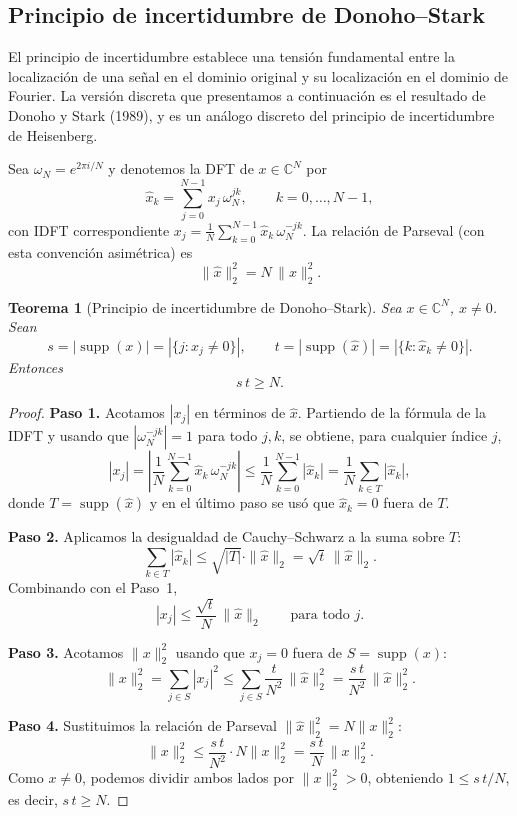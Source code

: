 \documentclass[12pt]{article}
\newtheorem{theorem}{Teorema}
\newcommand{\C}{\mathbb{C}}
\begin{document}
\subsection*{Principio de incertidumbre de Donoho--Stark}

El principio de incertidumbre establece una tensión fundamental entre la localización de una señal en el dominio original y su localización en el dominio de Fourier. La versión discreta que presentamos a continuación es el resultado de Donoho y Stark (1989), y es un análogo discreto del principio de incertidumbre de Heisenberg.

Sea $\omega_N = e^{2\pi i/N}$ y denotemos la DFT de $x \in \C^N$ por
\[
  \hat{x}_k = \sum_{j=0}^{N-1} x_j\, \omega_N^{jk}, \qquad k = 0, \ldots, N-1,
\]
con IDFT correspondiente $x_j = \frac{1}{N}\sum_{k=0}^{N-1} \hat{x}_k\, \omega_N^{-jk}$.
La relación de Parseval (con esta convención asimétrica) es
\[
  \|\hat{x}\|_2^2 = N\,\|x\|_2^2.
\]

\begin{theorem}[Principio de incertidumbre de Donoho--Stark]
Sea $x \in \C^N$, $x \neq 0$. Sean
\[
  s = |\operatorname{supp}(x)| = |\{j : x_j \neq 0\}|, \qquad
  t = |\operatorname{supp}(\hat{x})| = |\{k : \hat{x}_k \neq 0\}|.
\]
Entonces
\[
  s\,t \geq N.
\]
\end{theorem}

\begin{proof}
\textbf{Paso 1.} Acotamos $|x_j|$ en términos de $\hat{x}$.
Partiendo de la fórmula de la IDFT y usando que $|\omega_N^{-jk}| = 1$ para todo $j, k$, se obtiene, para cualquier índice $j$,
\[
  |x_j| = \left|\frac{1}{N}\sum_{k=0}^{N-1} \hat{x}_k\, \omega_N^{-jk}\right|
  \leq \frac{1}{N}\sum_{k=0}^{N-1} |\hat{x}_k|
  = \frac{1}{N}\sum_{k \in T} |\hat{x}_k|,
\]
donde $T = \operatorname{supp}(\hat{x})$ y en el último paso se usó que $\hat{x}_k = 0$ fuera de $T$.

\textbf{Paso 2.} Aplicamos la desigualdad de Cauchy--Schwarz a la suma sobre $T$:
\[
  \sum_{k \in T} |\hat{x}_k| \leq \sqrt{|T|}\cdot\|\hat{x}\|_2 = \sqrt{t}\,\|\hat{x}\|_2.
\]
Combinando con el Paso~1,
\[
  |x_j| \leq \frac{\sqrt{t}}{N}\,\|\hat{x}\|_2 \qquad \text{para todo } j.
\]

\textbf{Paso 3.} Acotamos $\|x\|_2^2$ usando que $x_j = 0$ fuera de $S = \operatorname{supp}(x)$:
\[
  \|x\|_2^2 = \sum_{j \in S} |x_j|^2 \leq \sum_{j \in S} \frac{t}{N^2}\,\|\hat{x}\|_2^2
  = \frac{s\,t}{N^2}\,\|\hat{x}\|_2^2.
\]

\textbf{Paso 4.} Sustituimos la relación de Parseval $\|\hat{x}\|_2^2 = N\|x\|_2^2$:
\[
  \|x\|_2^2 \leq \frac{s\,t}{N^2} \cdot N\|x\|_2^2 = \frac{s\,t}{N}\,\|x\|_2^2.
\]
Como $x \neq 0$, podemos dividir ambos lados por $\|x\|_2^2 > 0$, obteniendo $1 \leq s\,t/N$, es decir, $s\,t \geq N$.
\end{proof}
\end{document}
